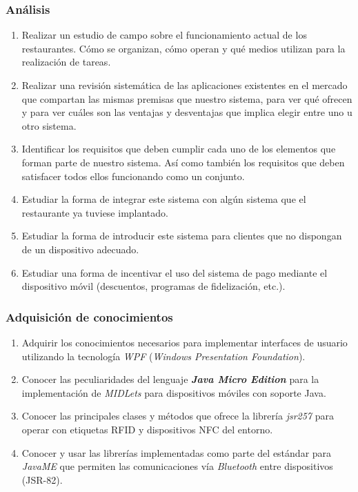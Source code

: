 \subsubsection{Análisis}
\begin{enumerate}
\item Realizar un estudio de campo sobre el funcionamiento actual de los
  restaurantes. Cómo se organizan, cómo operan y qué medios utilizan para la
  realización de tareas.
\item Realizar una revisión sistemática de las aplicaciones existentes en el
  mercado que compartan las mismas premisas que nuestro sistema, para ver qué
  ofrecen y para ver cuáles son las ventajas y desventajas que implica elegir
  entre uno u otro sistema.
\item Identificar los requisitos que deben cumplir cada uno de los elementos
  que forman parte de nuestro sistema. Así como también los requisitos que
  deben satisfacer todos ellos funcionando como un conjunto.
\item Estudiar la forma de integrar este sistema con algún sistema que el
  restaurante ya tuviese implantado.
\item Estudiar la forma de introducir este sistema para clientes que no
  dispongan de un dispositivo adecuado.
\item Estudiar una forma de incentivar el uso del sistema de pago mediante
  el dispositivo móvil (descuentos, programas de fidelización, etc.).
\end{enumerate}

\subsubsection{Adquisición de conocimientos}
\begin{enumerate}
\item Adquirir los conocimientos necesarios para implementar interfaces de
  usuario utilizando la tecnología \emph{WPF} (\emph{Windows Presentation
  Foundation}).
\item Conocer las peculiaridades del lenguaje \emph{\textbf{Java Micro
  Edition}} para la implementación de \emph{MIDLets} para dispositivos móviles
  con soporte Java.
\item Conocer las principales clases y métodos que ofrece la librería
  \emph{jsr257} para operar con etiquetas RFID y dispositivos NFC del entorno.
\item Conocer y usar las librerías implementadas como parte del estándar para
  \emph{JavaME} que permiten las comunicaciones vía \emph{Bluetooth} entre 
  dispositivos (JSR-82).  
\end{enumerate}

